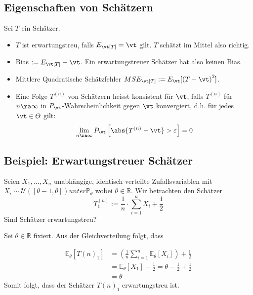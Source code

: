 \subsection{Eigenschaften von Schätzern}
Sei $T$ ein Schätzer.
\begin{itemize}
  \item $T$ ist erwartungstreu, falls $E_\vt[T] = \vt$ gilt. $T$ schätzt
        im Mittel also richtig.
  \item Bias $:= E_\vt[T] - \vt$. Ein erwartungstreuer Schätzer hat also keinen Bias.
  \item Mittlere Quadratische Schätzfehler $MSE_\vt[T] := E_\vt[ {(T - \vt)}^2]$.
  \item Eine Folge $T^{ (n)}$ von Schätzern heisst konsistent für $\vt$, falls $T^{
              (n)}$ für $n \ra \infty$ in $P_\vt$-Wahrscheinlichkeit gegen $\vt$ konvergiert,
        d.h. für jedes $\vt \in \varTheta$ gilt:
        \begin{align*}
          \lim_{n \ra \infty} P_\vt \left[ \abs{T^{ (n)} - \vt} > \varepsilon \right] = 0
        \end{align*}
\end{itemize}
\BoxStart{}
\subsection{Beispiel: Erwartungstreuer Schätzer}
Seien $X_1, \ldots, X_n$ unabhängige, identisch verteilte Zufallsvariablen mit $X_i \sim \mathcal{U}([\theta - 1, \theta]) unter \mathbb{P}_\theta$ 
wobei $\theta \in \mathbb{R}$. Wir betrachten den Schätzer 
\[T_1^{(n)} := \frac{1}{n} \cdot \sum_{i = 1}^n X_i + \frac{1}{2}\]
Sind Schätzer erwartungstreu?

Sei $\theta \in \mathbb{R}$ fixiert. Aus der Gleichverteilung folgt, dass

\begin{align*}
  \mathbb{E}_{\theta}[{T(n)}_1] &= \left(\frac{1}{n} \sum_{i=1}^{n} \mathbb{E}_{\theta}[X_i]\right) + \frac{1}{2} \\
                                &= \mathbb{E}_{\theta}[X_1] + \frac{1}{2} = \theta - \frac{1}{2} + \frac{1}{2} \\
                                &= \theta
\end{align*}
Somit folgt, dass der Schätzer ${T(n)}_1$ erwartungstreu ist.

\BoxEnd{}
